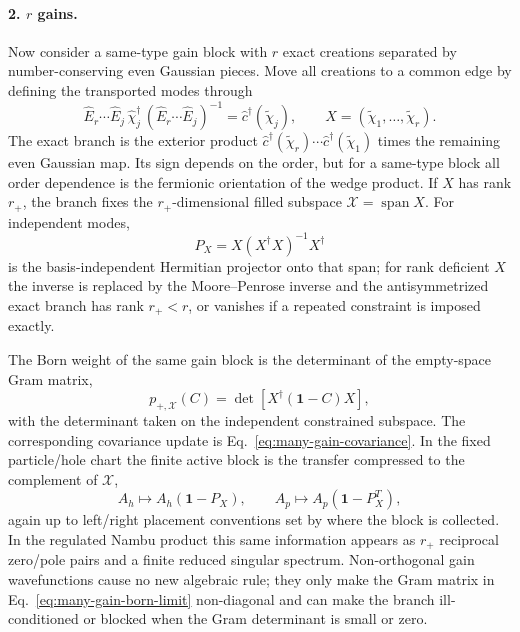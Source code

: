 \documentclass[aps,prb,onecolumn,nofootinbib,superscriptaddress]{revtex4-2}
\newcommand{\I}{\mathbf{1}}
\theoremstyle{plain}
\theoremstyle{definition}
\begin{document}
\paragraph*{2. \(r\) gains.}
Now consider a same-type gain block with \(r\) exact creations separated by
number-conserving even Gaussian pieces.  Move all creations to a common edge
by defining the transported modes through
\begin{equation}
  \hat E_r\cdots\hat E_j\,\hat\chi_j^\dagger\,
  (\hat E_r\cdots\hat E_j)^{-1}
  =
  \hat c^\dagger(\tilde\chi_j),
  \qquad
  X=(\tilde\chi_1,\ldots,\tilde\chi_r).
  \label{eq:many-gain-transported-modes}
\end{equation}
The exact branch is the exterior product
\(\hat c^\dagger(\tilde\chi_r)\cdots\hat c^\dagger(\tilde\chi_1)\) times the
remaining even Gaussian map.  Its sign depends on the order, but for a
same-type block all order dependence is the fermionic orientation of the
wedge product.  If \(X\) has rank \(r_+\), the branch fixes the
\(r_+\)-dimensional filled subspace
\(\mathcal X=\operatorname{span}X\).  For independent modes,
\begin{equation}
  P_X=X(X^\dagger X)^{-1}X^\dagger
  \label{eq:many-gain-span-projector}
\end{equation}
is the basis-independent Hermitian projector onto that span; for rank
deficient \(X\) the inverse is replaced by the Moore--Penrose inverse and the
antisymmetrized exact branch has rank \(r_+<r\), or vanishes if a repeated
constraint is imposed exactly.

The Born weight of the same gain block is the determinant of the empty-space
Gram matrix,
\begin{equation}
  p_{+,\mathcal X}(C)
  =
  \det\!\left[X^\dagger(\I-C)X\right],
  \label{eq:many-gain-born-limit}
\end{equation}
with the determinant taken on the independent constrained subspace.  The
corresponding covariance update is Eq.~\eqref{eq:many-gain-covariance}.
In the fixed particle/hole chart the finite active block is the transfer
compressed to the complement of \(\mathcal X\),
\begin{equation}
  A_h\mapsto A_h(\I-P_X),
  \qquad
  A_p\mapsto A_p(\I-P_X^T),
  \label{eq:many-gain-reduced-transfer}
\end{equation}
again up to left/right placement conventions set by where the block is
collected.  In the regulated Nambu product this same information appears as
\(r_+\) reciprocal zero/pole pairs and a finite reduced singular spectrum.
Non-orthogonal gain wavefunctions cause no new algebraic rule; they only make
the Gram matrix in Eq.~\eqref{eq:many-gain-born-limit} non-diagonal and can
make the branch ill-conditioned or blocked when the Gram determinant is small
or zero.
\end{document}
